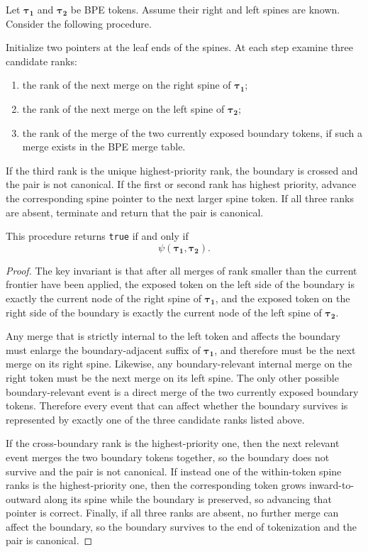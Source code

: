 \begin{proposition}
    \label{prop:spine-based-canonicality}
    Let $\boldsymbol{\tau_1}$ and $\boldsymbol{\tau_2}$ be BPE tokens.
    Assume their right and left spines are known.
    Consider the following procedure.

    Initialize two pointers at the leaf ends of the spines.
    At each step examine three candidate ranks:
    \begin{enumerate}
        \item the rank of the next merge on the right spine of $\boldsymbol{\tau_1}$;
        \item the rank of the next merge on the left spine of $\boldsymbol{\tau_2}$;
        \item the rank of the merge of the two currently exposed boundary tokens,
        if such a merge exists in the BPE merge table.
    \end{enumerate}
    If the third rank is the unique highest-priority rank, the boundary is crossed and the pair is not canonical.
    If the first or second rank has highest priority, advance the corresponding spine pointer to the next larger
    spine token. If all three ranks are absent, terminate and return that the pair is canonical.

    This procedure returns \texttt{true} if and only if
    \[
    \psi(\boldsymbol{\tau_1},\boldsymbol{\tau_2}).
    \]
\end{proposition}
\begin{proof}
    The key invariant is that after all merges of rank smaller than the current frontier have been applied,
    the exposed token on the left side of the boundary is exactly the current node of the right spine of
    $\boldsymbol{\tau_1}$, and the exposed token on the right side of the boundary is exactly the current node
    of the left spine of $\boldsymbol{\tau_2}$.

    Any merge that is strictly internal to the left token and affects the boundary must enlarge the
    boundary-adjacent suffix of $\boldsymbol{\tau_1}$, and therefore must be the next merge on its right spine.
    Likewise, any boundary-relevant internal merge on the right token must be the next merge on its left spine.
    The only other possible boundary-relevant event is a direct merge of the two currently exposed boundary tokens.
    Therefore every event that can affect whether the boundary survives is represented by exactly one of the
    three candidate ranks listed above.

    If the cross-boundary rank is the highest-priority one, then the next relevant event merges the two boundary
    tokens together, so the boundary does not survive and the pair is not canonical.
    If instead one of the within-token spine ranks is the highest-priority one, then the corresponding token grows
    inward-to-outward along its spine while the boundary is preserved, so advancing that pointer is correct.
    Finally, if all three ranks are absent, no further merge can affect the boundary, so the boundary survives to
    the end of tokenization and the pair is canonical.
\end{proof}

